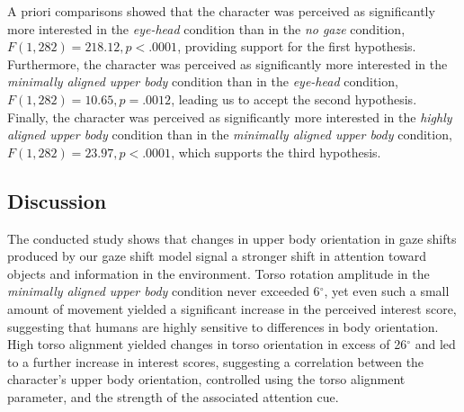 A priori comparisons showed that the character was perceived as significantly more interested in the \emph{eye-head} condition than in the \emph{no gaze} condition, $F(1, 282) = 218.12, p < .0001$, providing support for the first hypothesis. Furthermore, the character was perceived as significantly more interested in the \emph{minimally aligned upper body} condition than in the \emph{eye-head} condition, $F(1, 282) = 10.65, p = .0012$, leading us to accept the second hypothesis. Finally, the character was perceived as significantly more interested in the \emph{highly aligned upper body} condition than in the \emph{minimally aligned upper body} condition, $F(1, 282) = 23.97, p < .0001$, which supports the third hypothesis.

\subsection{Discussion}

The conducted study shows that changes in upper body orientation in gaze shifts produced by our gaze shift model signal a stronger shift in attention toward objects and information in the environment. Torso rotation amplitude in the \emph{minimally aligned upper body} condition never exceeded 6$^{\circ}$, yet even such a small amount of movement yielded a significant increase in the perceived interest score, suggesting that humans are highly sensitive to differences in body orientation. High torso alignment yielded changes in torso orientation in excess of 26$^{\circ}$ and led to a further increase in interest scores, suggesting a correlation between the character's upper body orientation, controlled using the torso alignment parameter, and the strength of the associated attention cue. 